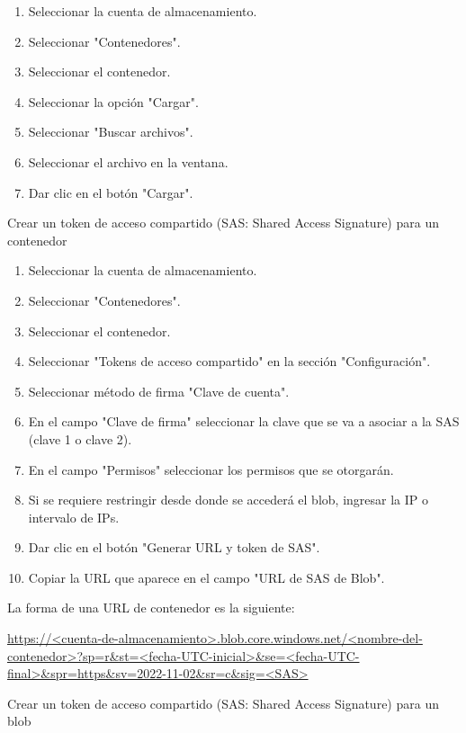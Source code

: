 \begin{enumerate}
\item Seleccionar la cuenta de almacenamiento.
\item Seleccionar "Contenedores".
\item Seleccionar el contenedor.
\item Seleccionar la opción "Cargar".
\item Seleccionar "Buscar archivos".
\item Seleccionar el archivo en la ventana.
\item Dar clic en el botón "Cargar".
\end{enumerate}

Crear un token de acceso compartido (SAS: Shared Access Signature) para un contenedor

\begin{enumerate}
\item Seleccionar la cuenta de almacenamiento.
\item Seleccionar "Contenedores".
\item Seleccionar el contenedor.
\item Seleccionar "Tokens de acceso compartido" en la sección "Configuración".
\item Seleccionar método de firma "Clave de cuenta".
\item En el campo "Clave de firma" seleccionar la clave que se va a asociar a la SAS (clave 1 o clave 2).
\item En el campo "Permisos" seleccionar los permisos que se otorgarán.
\item Si se requiere restringir desde donde se accederá el blob, ingresar la IP o intervalo de IPs.
\item Dar clic en el botón "Generar URL y token de SAS".
\item Copiar la URL que aparece en el campo "URL de SAS de Blob".
\end{enumerate}

La forma de una URL de contenedor es la siguiente:

\url{https://<cuenta-de-almacenamiento>.blob.core.windows.net/<nombre-del-contenedor>?sp=r&st=<fecha-UTC-inicial>&se=<fecha-UTC-final>&spr=https&sv=2022-11-02&sr=c&sig=<SAS>}

Crear un token de acceso compartido (SAS: Shared Access Signature) para un blob

